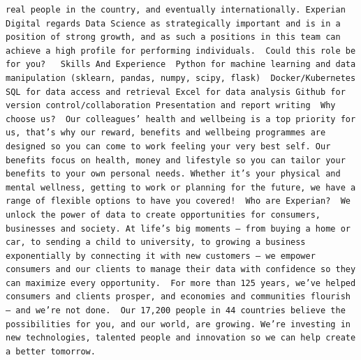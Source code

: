 \documentclass[
]{article}
\begin{document}
\begin{verbatim}
real people in the country, and eventually internationally. Experian Digital regards Data Science as strategically important and is in a position of strong growth, and as such a positions in this team can achieve a high profile for performing individuals.  Could this role be for you?   Skills And Experience  Python for machine learning and data manipulation (sklearn, pandas, numpy, scipy, flask)  Docker/Kubernetes SQL for data access and retrieval Excel for data analysis Github for version control/collaboration Presentation and report writing  Why choose us?  Our colleagues’ health and wellbeing is a top priority for us, that’s why our reward, benefits and wellbeing programmes are designed so you can come to work feeling your very best self. Our benefits focus on health, money and lifestyle so you can tailor your benefits to your own personal needs. Whether it’s your physical and mental wellness, getting to work or planning for the future, we have a range of flexible options to have you covered!  Who are Experian?  We unlock the power of data to create opportunities for consumers, businesses and society. At life’s big moments – from buying a home or car, to sending a child to university, to growing a business exponentially by connecting it with new customers – we empower consumers and our clients to manage their data with confidence so they can maximize every opportunity.  For more than 125 years, we’ve helped consumers and clients prosper, and economies and communities flourish – and we’re not done.  Our 17,200 people in 44 countries believe the possibilities for you, and our world, are growing. We’re investing in new technologies, talented people and innovation so we can help create a better tomorrow.

\end{verbatim}
\end{document}
